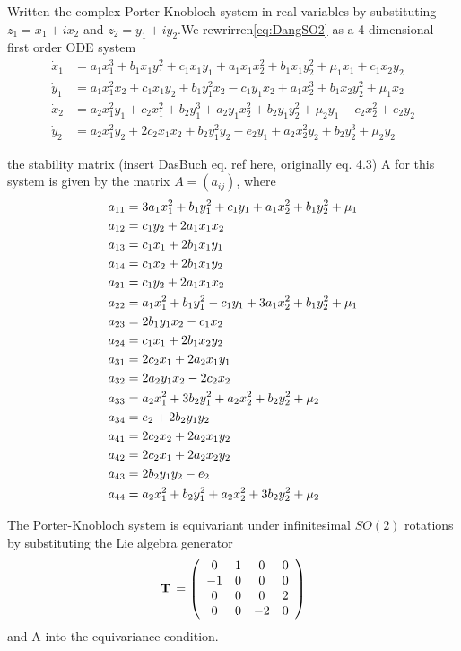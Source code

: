 \documentclass{article}
\begin{document}
Written the complex Porter-Knobloch system in real variables by substituting $z_1 = x_1 + i x_2$ and $z_2 = y_1 + i y_2$.We rewrirren\ref{eq:DangSO2} as a 4-dimensional first order ODE system			
			\begin{align}
				\dot{x}_1 &= a_1 x_1^3 + b_1 x_1 y_1^2 + c_1 x_1 y_1 + a_1 x_1 x_2^2 + b_1 x_1 y_2^2 + \mu_1 x_1 + c_1 x_2 y_2\\
				\dot{y}_1 &= a_1 x_1^2 x_2 + c_1 x_1 y_2 + b_1 y_1^2 x_2 - c_1 y_1 x_2 + a_1 x_2^3 + b_1 x_2 y_2^2 + \mu_1 x_2\\
				\dot{x}_2 &= a_2 x_1^2 y_1 + c_2 x_1^2 + b_2 y_1^3 + a_2 y_1 x_2^2 + b_2 y_1 y_2^2 + \mu_2 y_1 - c_2 x_2^2 + e_2 y_2\\
				\dot{y}_2 &= a_2 x_1^2 y_2 + 2 c_2 x_1 x_2 + b_2 y_1^2 y_2 - e_2 y_1 + a_2 x_2^2 y_2 + b_2 y_2^3 + \mu_2 y_2
			\end{align}

the stability matrix ({insert DasBuch eq. ref here, originally eq. 4.3}) A for this 				system is given by the matrix $A=(a_{ij})$, where
\begin{align}
a_{11}&=3 a_1 x_1^2 + b_1 y_1^2 + c_1 y_1 + a_1 x_2^2 + b_1 y_2^2 + \mu_1\\
a_{12}&=c_1 y_2 + 2 a_1 x_1 x_2\\
a_{13}&=c_1 x_1 + 2 b_1 x_1 y_1\\
a_{14}&=c_1 x_2 + 2 b_1 x_1 y_2\\
a_{21}&=c_1 y_2 + 2 a_1 x_1 x_2\\
a_{22}&=a_1 x_1^2 + b_1 y_1^2 - c_1 y_1 + 3 a_1 x_2^2 + b_1 y_2^2 + \mu_1\\
a_{23}&=2 b_1 y_1 x_2 - c_1 x_2\\
a_{24}&=c_1 x_1 + 2 b_1 x_2 y_2\\
a_{31}&=2 c_2 x_1 + 2 a_2 x_1 y_1\\
a_{32}&=2 a_2 y_1 x_2 - 2 c_2 x_2\\
a_{33}&=a_2 x_1^2 + 3 b_2 y_1^2 + a_2 x_2^2 + b_2 y_2^2 + \mu_2\\
a_{34}&=e_2 + 2 b_2 y_1 y_2\\
a_{41}&= 2 c_2 x_2 + 2 a_2 x_1 y_2\\
a_{42}&=2 c_2 x_1 + 2 a_2 x_2 y_2\\
a_{43}&= 2 b_2 y_1 y_2 - e_2\\
a_{44}&=a_2 x_1^2 + b_2 y_1^2 + a_2 x_2^2 + 3 b_2 y_2^2 + \mu_2
\label{{2modeStabMatrix}}
\end{align}

The Porter-Knobloch system is equivariant under infinitesimal $SO(2)$ rotations by substituting the Lie algebra generator
    \begin{equation}
\mathbf{T}  \, =
\left( \begin{array}{cccc}
         0 & 1 & 0 & 0 \\
        -1 & 0 & 0 & 0 \\
         0 & 0 & 0 & 2\\
         0 & 0 & -2 & 0
      \end{array} \right)
\label{{LGTwoMode}}
\end{equation}
and A into the equivariance condition.
\end{document}
